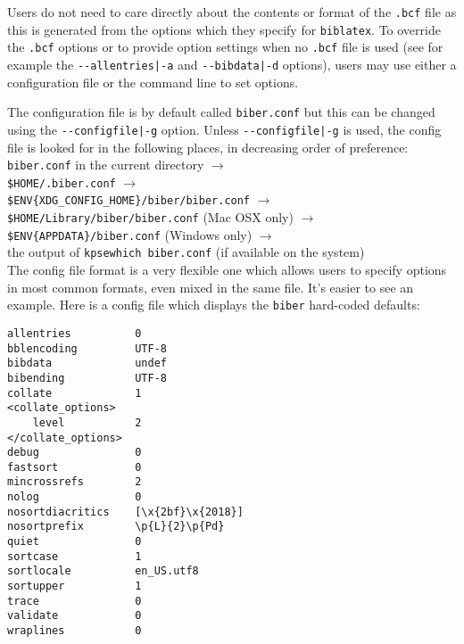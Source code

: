 \documentclass{ltxdockit}
\begin{document}
\noindent Users do not need to care directly about the contents or format of the
\verb+.bcf+ file as this is generated from the options which they specify
for \verb+biblatex+. To override the \verb+.bcf+ options or to provide
option settings when no \verb+.bcf+ file is used (see for example the
\verb+--allentries|-a+ and \verb+--bibdata|-d+ options), users
may use either a configuration file or the command line to set options.

The configuration file is by default called \verb+biber.conf+ but this can
be changed using the \verb+--configfile|-g+ option. Unless
\verb+--configfile|-g+ is used, the config file is
looked for in the following places, in decreasing order of preference:\\[2ex]

\noindent \verb+biber.conf+ in the current directory $\rightarrow$\\
\hspace*{1em}\verb+$HOME/.biber.conf+ $\rightarrow$\\
\hspace*{2em}\verb+$ENV{XDG_CONFIG_HOME}/biber/biber.conf+ $\rightarrow$\\
\hspace*{3em}\verb+$HOME/Library/biber/biber.conf+ (Mac OSX only)
$\rightarrow$\\
\hspace*{3em}\verb+$ENV{APPDATA}/biber.conf+ (Windows only) $\rightarrow$\\
\hspace*{4em}the output of \verb+kpsewhich biber.conf+ (if available on the
system)\\[2ex]

\noindent The config file format is a very flexible one which allows users to specify
options in most common formats, even mixed in the same file. It's easier to
see an example. Here is a config file which displays the \verb+biber+
hard-coded defaults:

\begin{verbatim}
allentries          0
bblencoding         UTF-8
bibdata             undef 
bibending           UTF-8
collate             1
<collate_options>
    level           2
</collate_options>
debug               0
fastsort            0
mincrossrefs        2
nolog               0
nosortdiacritics    [\x{2bf}\x{2018}]
nosortprefix        \p{L}{2}\p{Pd}
quiet               0
sortcase            1
sortlocale          en_US.utf8
sortupper           1
trace               0
validate            0
wraplines           0
\end{verbatim}
\end{document}

